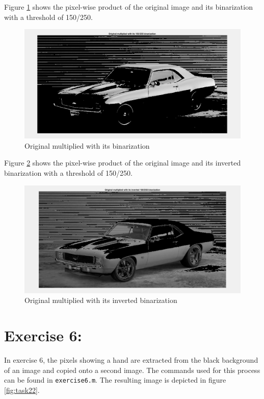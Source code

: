 \documentclass[11pt]{article}
\begin{document}
Figure \ref{fig:task20} shows the pixel-wise product of the original image and its binarization with a threshold of 150/250.

\begin{figure}[!hbt]
  \includegraphics[width=\textwidth]{task20}
  \caption{Original multiplied with its binarization}
  \label{fig:task20}
\end{figure}

Figure \ref{fig:task21} shows the pixel-wise product of the original image and its inverted binarization with a threshold of 150/250.

\begin{figure}[!hbt]
  \includegraphics[width=\textwidth]{task21}
  \caption{Original multiplied with its inverted binarization}
  \label{fig:task21}
\end{figure}

\section*{Exercise 6:}

In exercise 6, the pixels showing a hand are extracted from the black background of an image and copied onto a second image. The commands used for this process can be found in \texttt{exercise6.m}. The resulting image is depicted in figure \ref{fig:task22}.
\end{document}
